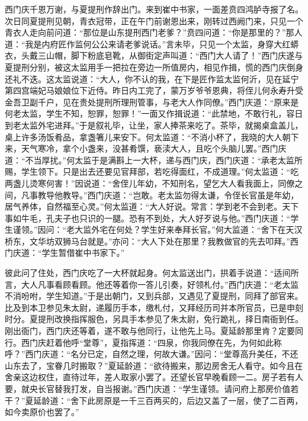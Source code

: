 西门庆千恩万谢，与夏提刑作辞出门。来到崔中书家，一面差贲四鸿胪寺报了名。次日同夏提刑见朝，青衣冠带，正在午门前谢恩出来，刚转过西阙门来，只见一个青衣人走向前问道：“那位是山东提刑西门老爹？”贲四问道：“你是那里的？”那人道：“我是内府匠作监何公公来请老爹说话。”言未毕，只见一个太监，身穿大红蟒衣，头戴三山帽，脚下粉底皂靴，从御街定声叫道：“西门大人请了！”西门庆遂与夏提刑分别，被这太监用手一把拉在旁边一所值房内，相见作揖，慌的西门庆倒身还礼不迭。这太监说道：“大人，你不认的我，在下是匠作监太监何沂，见在延宁第四宫端妃马娘娘位下近侍。昨日内工完了，蒙万岁爷爷恩典，将侄儿何永寿升受金吾卫副千户，见在贵处提刑所理刑管事，与老大人作同僚。”西门庆道：“原来是何老太监，学生不知，恕罪，恕罪！”一面又作揖说道：“此禁地，不敢行礼，容日到老太监外宅进拜。”于是叙礼毕，让坐，家人捧茶来吃了。茶毕，就揭桌盒盖儿，桌上许多汤饭肴品，拿盏箸儿来安下。何太监道：“不消小杯了，我晓的大人朝下来，天气寒冷，拿个小盏来，没甚肴馔，亵渎大人，且吃个头脑儿罢。”西门庆道：“不当厚扰。”何太监于是满斟上一大杯，递与西门庆，西门庆道：“承老太监所赐，学生领下。只是出去还要见官拜部，若吃得面红，不成道理。”何太监道：“吃两盏儿烫寒何害！”因说道：“舍侄儿年幼，不知刑名，望乞大人看我面上，同僚之间，凡事教导他教导。”西门庆道：“岂敢。老太监勿得太谦，令侄长官虽是年幼，居气养体，自然福至心灵。”何太监道：“大人好说。常言：学到老不会到老。天下事如牛毛，孔夫子也只识的一腿。恐有不到处，大人好歹说与他。”西门庆道：“学生谨领。”因问：“老大监外宅在何处？学生好来奉拜长官。”何大监道：“舍下在天汉桥东，文华坊双狮马台就是。”亦问：“大人下处在那里？我教做官的先去叩拜。”西门庆道：“学生暂借崔中书家下。”

彼此问了住处，西门庆吃了一大杯就起身。何太监送出门，拱着手说道：“适间所言，大人凡事看顾看顾。他还等着你一答儿引奏，好领札付。”西门庆道：“老太监不消吩咐，学生知道。”于是出朝门，又到兵部，又遇见了夏提刑，同拜了部官来。比及到本卫参见朱太尉，递履历手本，缴札付，又拜经历司并本所官员，已是申刻时分。夏提刑改换指挥服色，另具手本参见了朱太尉，免行跪礼，择日南衙到任。刚出衙门，西门庆还等着，遂不敢与他同行，让他先上马。夏延龄那里肯？定要同行。西门庆赶着他呼“堂尊”，夏指挥道：“四泉，你我同僚在先，为何如此称呼？”西门庆道：“名分已定，自然之理，何故大谦。”因问：“堂尊高升美任，不还山东去了，宝眷几时搬取？”夏延龄道：“欲待搬来，那边房舍无人看守。如今且在舍亲这边权住，直待过年，差人取家小罢了。还望长官早晚看顾一二。房子若有人要，就央长官替我打发，自当报谢。”西门庆道：“学生谨领。请问府上那房价值若干？”夏延龄道：“舍下此房原是一千三百两买的，后边又盖了一层，使了二百两，如今卖原价也罢了。”

